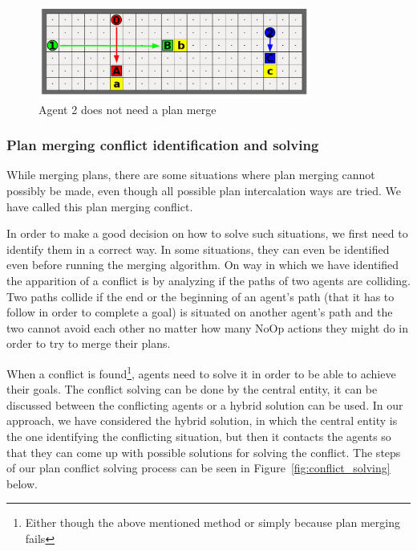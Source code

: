 \begin{figure}[htb]
\begin{center}
 \includegraphics[width=0.8\textwidth]{figures/no_merge.png}
 \caption{Agent 2 does not need a plan merge}
 \label{fig:no_merge}
\end{center}
\end{figure}

\subsubsection{Plan merging conflict identification and solving}

While merging plans, there are some situations where plan merging cannot possibly be made, even though all
possible plan intercalation ways are tried. We have called this plan merging conflict.

In order to make a good decision on how to solve such situations, we first need to identify them in a correct
way. In some situations, they can even be identified even before running the merging algorithm. On way in
which we have identified the apparition of a conflict is by analyzing if the paths of two agents are
colliding. Two paths collide if the end or the beginning of an agent’s path (that it has to follow in order to
complete a goal) is situated on another agent’s path and the two cannot avoid each other no matter how many
NoOp actions they might do in order to try to merge their plans.

When a conflict is found\footnote{Either though the above mentioned method or simply because plan merging
fails}, agents need to solve it in order to be able to achieve their goals. The conflict solving can be done
by the central entity, it can be discussed between the conflicting agents or a hybrid solution can be used. In
our approach, we have considered the hybrid solution, in which the central entity is the one identifying the
conflicting situation, but then it contacts the agents so that they can come up with possible solutions for
solving the conflict. The steps of our plan conflict solving process can be seen in
Figure~\ref{fig:conflict_solving} below.

